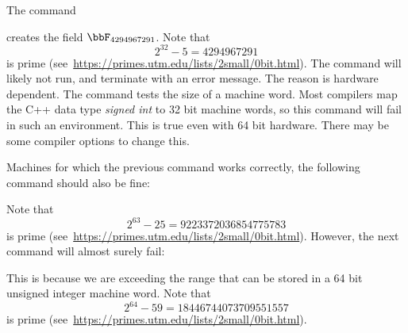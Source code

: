 \bigskip

The command  


creates the field $\bbF_{4294967291}$. 
Note that 
$$
2^{32}-5 = 4294967291
$$
is prime (see~\url{https://primes.utm.edu/lists/2small/0bit.html}).
The command will likely not run, and terminate with an error message. 
The reason is hardware dependent. 
The command tests the size of a machine word.
Most compilers map the C++ data type 
{\em signed int} to 32 bit machine words, 
so this command will fail in such an environment. 
This is true even with 64 bit hardware.
There may be some compiler options to change this.



\bigskip

Machines for which the previous command works correctly, the following command should also be fine:


Note that 
$$
2^{63}-25 = 9223372036854775783
$$
is prime (see~\url{https://primes.utm.edu/lists/2small/0bit.html}).
However, the next command will almost surely fail:


This is because we are exceeding the range 
that can be stored in a 64 bit unsigned integer machine word.
Note that 
$$
2^{64}-59 = 18446744073709551557
$$
is prime (see~\url{https://primes.utm.edu/lists/2small/0bit.html}).







